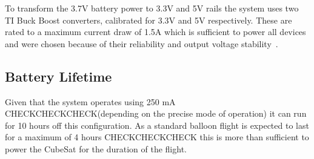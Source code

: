 To transform the 3.7V battery power to 3.3V and 5V rails the system uses two TI Buck Boost converters, calibrated for 3.3V and 5V respectively.  These are rated to a maximum current draw of 1.5A which is sufficient to power all devices and were chosen because of their reliability and output voltage stability~\cite{bbdatasheet}.

\subsection{Battery Lifetime}
Given that the system operates using 250 mA CHECKCHECKCHECK(depending on the precise mode of operation) it can run for 10 hours off this configuration.  As a standard balloon flight is expected to last for a maximum of 4 hours CHECKCHECKCHECK this is more than sufficient to power the CubeSat for the duration of the flight.
